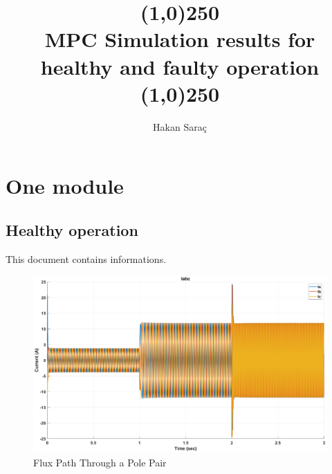 \documentclass{article}
\author{\hisfont Hakan Saraç}
\date{}
\begin{document}
\title{\line(1,0){250}\\\myfont MPC Simulation results for healthy and faulty operation\\\line(1,0){250}}
\maketitle
\newpage
\tableofcontents
\newpage


\section{One module}
\subsection{Healthy operation}
This document contains informations.



\begin{figure}[h!]
\centering
\includegraphics[scale=0.35]{SimulationResults/one_module/Iabc.eps}
\caption{Flux Path Through a Pole Pair }
\label{fig:FluxPath}
\end{figure}





\end{document}
